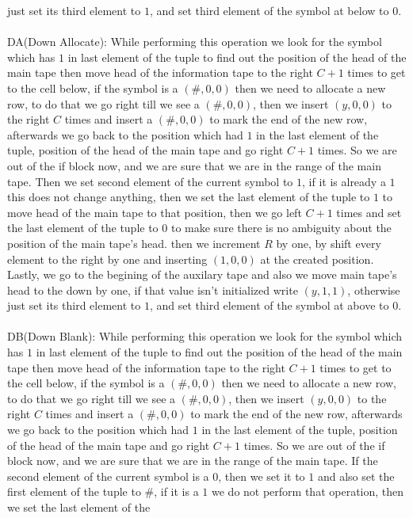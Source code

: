 \documentclass[12pt]{article}
\begin{document}
just set its third element to $1$, and set third element of the symbol at below to $0$.\\
\\
DA(Down Allocate): While performing this operation we look for the symbol which has $1$ in
last element of the tuple to find out the position of the head of the main tape then move head 
of the information tape to the right $C+1$ times to get to the cell below, if the symbol is a $(\#,0,0)$
then we need to allocate a new row, to do that we go right till we see a $(\#,0,0)$, then 
we insert $(y,0,0)$ to the right $C$ times and insert a $(\#,0,0)$ to mark the end of the new row,
afterwards we go back to the position which had $1$ in the last element of the tuple,
position of the head of the main tape and go right $C+1$ times. So we are out of the if block now,
and we are sure that we are in the range of the main tape. Then we set second element of the current symbol
to $1$, if it is already a $1$ this does not change anything, then we set the last element of the
tuple to $1$ to move head of the main tape to that position, then we go left $C+1$ times and set the
last element of the tuple to $0$ to make sure there is no ambiguity about the position of the
main tape's head. then we increment $R$ by one, by shift every element to the right by one
and inserting $(1,0,0)$ at the created position. Lastly, we go to the begining of the auxilary tape
and also we move main tape's head to the down by one, if that value isn't initialized write $(y,1,1)$, otherwise
just set its third element to $1$, and set third element of the symbol at above to $0$.\\
\\
DB(Down Blank): While performing this operation we look for the symbol which has $1$ in
last element of the tuple to find out the position of the head of the main tape then move head 
of the information tape to the right $C+1$ times to get to the cell below, if the symbol is a $(\#,0,0)$
then we need to allocate a new row, to do that we go right till we see a $(\#,0,0)$, then 
we insert $(y,0,0)$ to the right $C$ times and insert a $(\#,0,0)$ to mark the end of the new row,
afterwards we go back to the position which had $1$ in the last element of the tuple,
position of the head of the main tape and go right $C+1$ times. So we are out of the if block now,
and we are sure that we are in the range of the main tape. If the second element of the
current symbol is a $0$, then we set it to $1$ and also set the first element of the tuple to $\#$,
if it is a $1$ we do not perform that operation, then we set the last element of the
\end{document}

